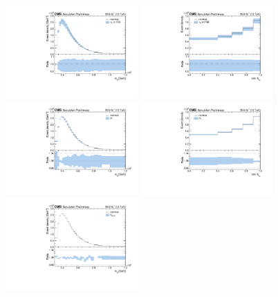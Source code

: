 \begin{figure}
  \centering
  \includegraphics[width=0.45\textwidth]{fig/chapt7/syst/impacts/MassTT/scalePS.pdf}
  \includegraphics[width=0.45\textwidth]{fig/chapt7/syst/impacts/CosTopLepTT/scalePS.pdf} \\
  \includegraphics[width=0.45\textwidth]{fig/chapt7/syst/impacts/MassTT/massTop.pdf}
  \includegraphics[width=0.45\textwidth]{fig/chapt7/syst/impacts/CosTopLepTT/massTop.pdf} \\
  \includegraphics[width=0.45\textwidth]{fig/chapt7/syst/impacts/MassTT/hDamp.pdf}

\end{figure}
